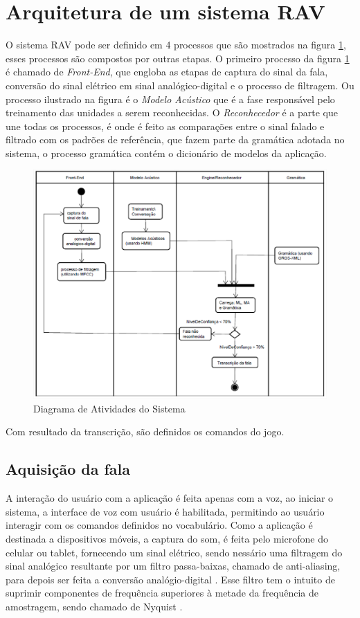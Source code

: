 \section{Arquitetura de um sistema RAV}
O sistema RAV pode ser definido em 4 processos que são mostrados na figura \ref{figArqRav}, esses processos são compostos por outras etapas. O primeiro processo da figura \ref{figArqRav} é chamado de \textit{Front-End}, que engloba as etapas de captura do sinal da fala, conversão do sinal elétrico em sinal analógico-digital e o processo de filtragem. Ou processo ilustrado na figura é o \textit{Modelo Acústico} que é a fase responsável pelo treinamento das unidades a serem reconhecidas. O \textit{Reconhecedor} é a parte que une todas os processos, é onde é feito as comparações entre o sinal falado e filtrado com os padrões de referência, que fazem parte da gramática adotada no sistema, o processo gramática contém o dicionário de modelos da aplicação. 
\begin{figure}[H]
\includegraphics[width=1\textwidth]{graficos/desenvolvimento_rav.eps}
\caption{Diagrama de Atividades do Sistema}
\label{figArqRav}
\end{figure}

Com resultado da transcrição, são definidos os comandos do jogo.

\subsection{Aquisição da fala}

A interação do usuário com a aplicação é feita apenas com a voz, ao iniciar o sistema, a interface de voz com usuário é habilitada, permitindo ao usuário interagir com os comandos definidos no vocabulário. Como a aplicação é destinada a dispositivos móveis, a captura do som, é feita pelo microfone do celular ou tablet, fornecendo um sinal elétrico, sendo nessário uma filtragem do sinal analógico resultante por um filtro passa-baixas, chamado de anti-aliasing, para depois ser feita a conversão analógio-digital \cite{DigitalProcRabiner}. Esse filtro tem o intuito de suprimir componentes de frequência superiores à metade da frequência de amostragem, sendo chamado de Nyquist \cite{DigitalSigProakis}.

